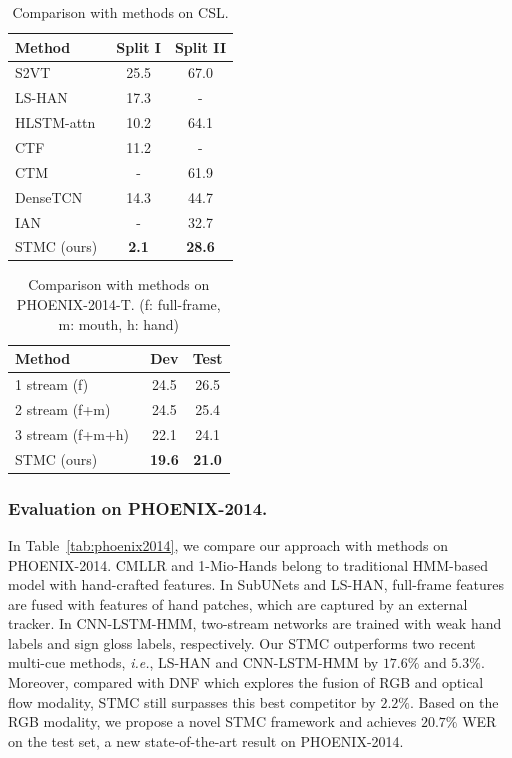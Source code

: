 \documentclass[letterpaper]{article} %
\begin{document}
\begin{table}[tp]
    \centering
    \small
    \caption{Comparison with methods on CSL.} \label{tab:CSL}
    \begin{tabular}{l|c|c}
    \hline
    Method                          & Split I & Split II  \\ \hline
    S2VT~\cite{s2vt-v}              & 25.5    & 67.0      \\
    LS-HAN~\cite{han}               & 17.3    &  -        \\
    HLSTM-attn~\cite{hlstm}         & 10.2    & 64.1      \\
    CTF~\cite{MM}                   & 11.2    &  -        \\ 
    CTM~\cite{ctm}                  &  -      & 61.9      \\
    DenseTCN~\cite{densetcn}        & 14.3    & 44.7      \\
    IAN~\cite{ian}                  &  -      & 32.7      \\ \hline
    STMC (ours)                     & \textbf{2.1}     & \textbf{28.6}      \\ \hline
    \end{tabular}
\end{table}


\begin{table}[tp]
    \centering
    \small
    \caption{Comparison with methods on PHOENIX-2014-T. (f: full-frame, m: mouth, h: hand)} \label{tab:phoenix-2014-t}
    \begin{tabular}{l|c|c}
    \hline
    Method                              & Dev & Test  \\ \hline
    1 stream (f)~\cite{tpami19}         & 24.5    & 26.5      \\
    2 stream (f+m)~\cite{tpami19}       & 24.5    & 25.4      \\
    3 stream (f+m+h)~\cite{tpami19}     & 22.1    & 24.1      \\ \hline
    STMC (ours)                         & \textbf{19.6}     & \textbf{21.0}      \\ \hline
    \end{tabular}
\end{table}


\subsubsection{Evaluation on PHOENIX-2014.} In Table~\ref{tab:phoenix2014}, we compare our approach with methods on PHOENIX-2014. 
CMLLR and 1-Mio-Hands belong to traditional HMM-based model with hand-crafted features. In SubUNets and LS-HAN, full-frame features are fused with features of hand patches, which are captured by an external tracker. In CNN-LSTM-HMM, two-stream networks are trained with weak hand labels and sign gloss labels, respectively. Our STMC outperforms two recent multi-cue methods, \emph{i.e.}, LS-HAN and CNN-LSTM-HMM by $17.6\%$ and $5.3\%$. Moreover, compared with DNF which explores the fusion of RGB and optical flow modality, STMC still surpasses this best competitor by $2.2\%$. Based on the RGB modality, we propose a novel STMC framework and achieves $20.7\%$ WER on the test set, a new state-of-the-art result on PHOENIX-2014.
\end{document}
